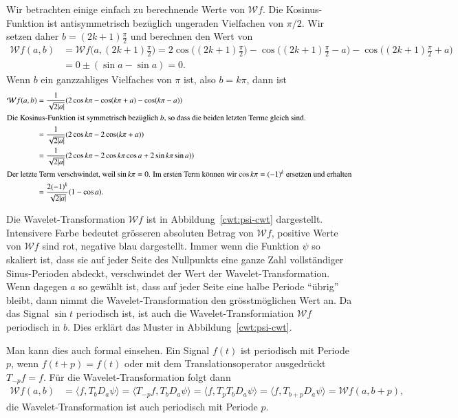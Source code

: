 \begin{beispiel}
Wir betrachten einige einfach zu berechnende Werte von $\mathcal{W}f$.
Die Kosinus-Funktion ist antisymmetrisch bezüglich ungeraden Vielfachen
von $\pi/2$.
Wir setzen daher $b=(2k+1)\frac{\pi}2$ und berechnen den Wert von
\begin{align*}
\mathcal{W}f(a,b)
&=
\mathcal{W}f\biggl(a,(2k+1)\frac{\pi}2\biggr)
=
2\cos\biggl((2k+1)\frac{\pi}2\biggr)
-\cos\biggl((2k+1)\frac{\pi}2 -a\biggr)
-\cos\biggl((2k+1)\frac{\pi}2 +a\biggr)
\\
&=
0
\pm(\sin a - \sin a)
=0.
\end{align*}
Wenn $b$ ein ganzzahliges Vielfaches von $\pi$ ist, also $b=k\pi$, dann ist 
\begin{align*}
\mathcal{W}f(a,b)
&=
\frac{1}{\sqrt{2|a|}}(2\cos k\pi - \cos(k\pi +a) -\cos(k\pi-a))
\\
\intertext{Die Kosinus-Funktion ist symmetrisch bezüglich $b$, so dass die
beiden letzten Terme gleich sind.  }
&=
\frac{1}{\sqrt{2|a|}}(2\cos k\pi - 2\cos(k\pi +a))
\\
&=
\frac{1}{\sqrt{2|a|}}(2\cos k\pi - 2\cos k\pi \cos a + 2 \sin k\pi \sin a))
\\
\intertext{Der letzte Term verschwindet, weil $\sin k\pi=0$.
Im ersten Term können wir $\cos k\pi=(-1)^k$ ersetzen und erhalten}
&=
\frac{2(-1)^k}{\sqrt{2|a|}}(1 - \cos a).
\end{align*}

Die Wavelet-Transformation $\mathcal{W}f$ ist in Abbildung~\ref{cwt:psi-cwt}
dargestellt.
Intensivere Farbe bedeutet grösseren absoluten Betrag von $\mathcal{W}f$,
positive Werte von $\mathcal{W}f$ sind rot, negative blau dargestellt.
Immer wenn die Funktion $\psi$ so skaliert ist, dass sie auf jeder
Seite des Nullpunkts eine ganze Zahl vollständiger Sinus-Perioden abdeckt,
verschwindet der Wert der Wavelet-Transformation.
Wenn dagegen $a$ so gewählt ist, dass auf jeder Seite eine halbe Periode
``übrig'' bleibt, dann nimmt die Wavelet-Transformation den grösstmöglichen
Wert an.
Da das Signal $\sin t$ periodisch ist, ist auch die Wavelet-Transformiation
$\mathcal{W}f$ periodisch in $b$.
Dies erklärt das Muster in Abbildung~\ref{cwt:psi-cwt}.

Man kann dies auch formal einsehen. 
Ein Signal $f(t)$ ist periodisch mit Periode $p$, wenn $f(t+p) = f(t)$
oder mit dem Translationsoperator ausgedrückt $T_{-p}f=f$.
Für die Wavelet-Transformation folgt dann
\begin{align*}
\mathcal{W}f(a,b)
&=
\langle f,T_bD_a\psi\rangle
=
\langle T_{-p}f,T_bD_a\psi\rangle
=
\langle f,T_pT_bD_a\psi\rangle
=
\langle f, T_{b+p}D_a\psi\rangle
=
\mathcal{W}f(a,b+p),
\end{align*}
die Wavelet-Transformation ist auch periodisch mit Periode $p$.
\end{beispiel}

